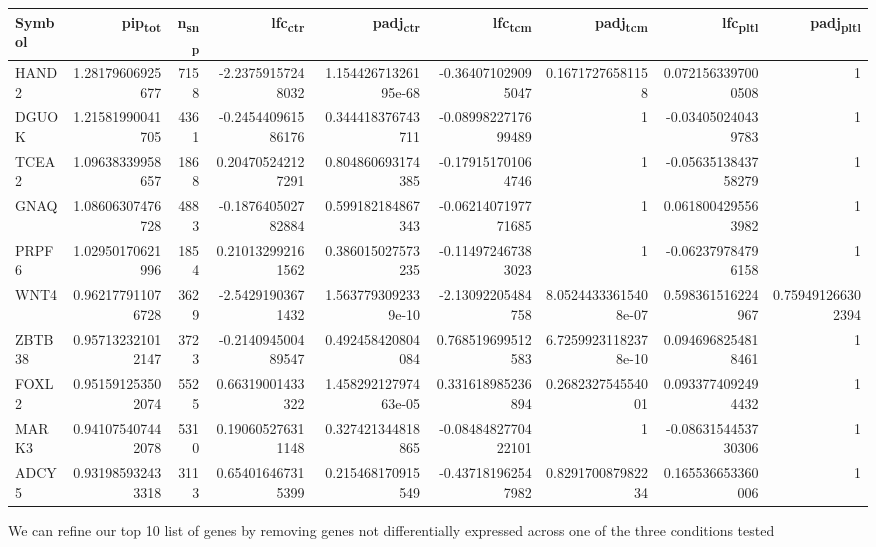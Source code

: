 \begin{center}
\begin{tabular}{lrrrrrrrr}
Symbol & pip\textsubscript{tot} & n\textsubscript{snp} & lfc\textsubscript{ctr} & padj\textsubscript{ctr} & lfc\textsubscript{tcm} & padj\textsubscript{tcm} & lfc\textsubscript{pltl} & padj\textsubscript{pltl}\\
\hline
HAND2 & 1.28179606925677 & 7158 & -2.23759157248032 & 1.15442671326195e-68 & -0.364071029095047 & 0.16717276581158 & 0.0721563397000508 & 1\\
DGUOK & 1.21581990041705 & 4361 & -0.245440961586176 & 0.344418376743711 & -0.0899822717699489 & 1 & -0.034050240439783 & 1\\
TCEA2 & 1.09638339958657 & 1868 & 0.204705242127291 & 0.804860693174385 & -0.179151701064746 & 1 & -0.0563513843758279 & 1\\
GNAQ & 1.08606307476728 & 4883 & -0.187640502782884 & 0.599182184867343 & -0.0621407197771685 & 1 & 0.0618004295563982 & 1\\
PRPF6 & 1.02950170621996 & 1854 & 0.210132992161562 & 0.386015027573235 & -0.114972467383023 & 1 & -0.062379784796158 & 1\\
WNT4 & 0.962177911076728 & 3629 & -2.54291903671432 & 1.5637793092339e-10 & -2.13092205484758 & 8.05244333615408e-07 & 0.598361516224967 & 0.759491266302394\\
ZBTB38 & 0.957132321012147 & 3723 & -0.214094500489547 & 0.492458420804084 & 0.768519699512583 & 6.72599231182378e-10 & 0.0946968254818461 & 1\\
FOXL2 & 0.951591253502074 & 5525 & 0.66319001433322 & 1.45829212797463e-05 & 0.331618985236894 & 0.268232754554001 & 0.0933774092494432 & 1\\
MARK3 & 0.941075407442078 & 5310 & 0.190605276311148 & 0.327421344818865 & -0.0848482770422101 & 1 & -0.0863154453730306 & 1\\
ADCY5 & 0.931985932433318 & 3113 & 0.654016467315399 & 0.215468170915549 & -0.437181962547982 & 0.829170087982234 & 0.165536653360006 & 1\\
\end{tabular}
\end{center}


We can refine our top 10 list of genes by removing genes not differentially expressed across one of the three conditions tested

